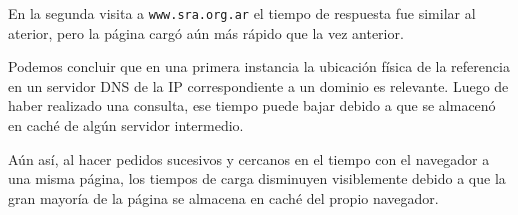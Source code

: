 En la segunda visita a \texttt{www.sra.org.ar} el tiempo de respuesta fue similar al aterior, pero la página cargó aún más rápido que la vez anterior.

Podemos concluir que en una primera instancia la ubicación física de la referencia en un servidor DNS de la IP correspondiente a un dominio es relevante. Luego de haber realizado una consulta, ese tiempo puede bajar debido a que se almacenó en caché de algún servidor intermedio. 

Aún así, al hacer pedidos sucesivos y cercanos en el tiempo con el navegador a una misma página, los tiempos de carga disminuyen visiblemente debido a que la gran mayoría de la página se almacena en caché del propio navegador.
\clearpage
\printbibliography


